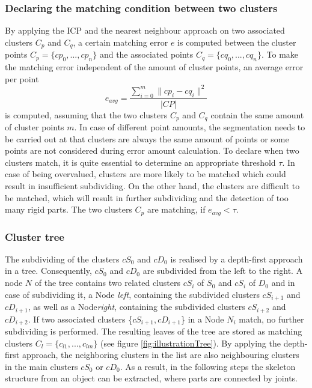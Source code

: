 \documentclass[a4paper,english,11pt]{report}
\begin{document}
\subsubsection{Declaring the matching condition between two clusters}

By applying the ICP and the nearest neighbour approach on two associated clusters $C_p$ and $C_q$, a certain matching error $e$ is computed between the cluster points $ C_p =  \{ {cp_0, ..., cp_n}\}$ and the associated points $ C_q =  \{ {cq_0, ..., cq_n}\}$. To make the matching error independent of the amount of cluster points, an average error per point
%
\begin{equation}
e_{avg} = \frac{\displaystyle\sum_{i=0}^{m}\| cp_i - cq_i\|^2}{| CP |}
\end{equation}
%
is computed, assuming that the two clusters $C_p$ and $C_q$ contain the same amount of cluster points $m$. In case of different point amounts, the segmentation needs to be carried out at that clusters are always the same amount of points or some points are not considered during error amount calculation. To declare when two clusters match, it is quite essential to determine an appropriate threshold $\tau$. In case of being overvalued, clusters are more likely to be matched which could result in insufficient subdividing. On the other hand, the clusters are difficult to be matched, which will result in further subdividing and the detection of too many rigid parts. The two clusters $C_p$ are matching, if $e_{avg} < \tau$.

\subsubsection{Cluster tree}
\label{tree}

The subdividing of the clusters $cS_0$ and $cD_0$ is realised by a depth-first approach in a tree. Consequently, $cS_0$ and $cD_0$ are subdivided from the left to the right. A node $N$ of the tree contains two related clusters $cS_i$ of $S_0$ and $cS_i$ of $D_0$ and in case of subdividing it, a Node \textit{left}, containing the subdivided clusters $cS_{i+1}$ and $cD_{i+1}$, as well as a Node\textit{right}, containing the subdivided clusters $cS_{i+2}$ and $cD_{i+2}$. If two associated clusters \{$cS_{i+1}, cD_{i+1}$\} in a Node $N_i$ match, no further subdividing is performed. The resulting leaves of the tree are stored as matching clusters $C_l = \{{c_{l1}, ... , c_{lm}}\}$ (see figure \ref{fig:illustrationTree}). By applying the depth-first approach, the neighboring clusters in the list are also neighbouring clusters in the main clusters $cS_0$ or $cD_0$.  As a result, in the following steps the skeleton structure from an object can be extracted, where parts are connected by joints.
\end{document}

